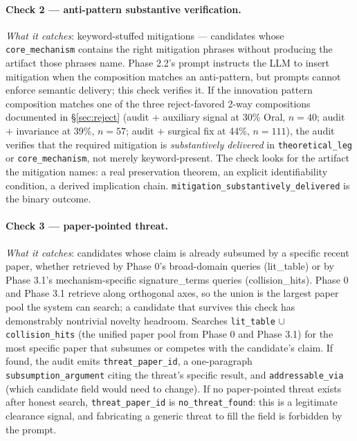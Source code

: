 \documentclass[10pt,a4paper]{article}
\begin{document}
\paragraph{Check 2 --- anti-pattern substantive verification.} \emph{What it catches}: keyword-stuffed mitigations --- candidates whose \texttt{core\_mechanism} contains the right mitigation phrases without producing the artifact those phrases name. Phase 2.2's prompt instructs the LLM to insert mitigation when the composition matches an anti-pattern, but prompts cannot enforce semantic delivery; this check verifies it. If the innovation pattern composition matches one of the three reject-favored 2-way compositions documented in \S\ref{sec:reject} (audit $+$ auxiliary signal at 30\% Oral, $n{=}40$; audit $+$ invariance at 39\%, $n{=}57$; audit $+$ surgical fix at 44\%, $n{=}111$), the audit verifies that the required mitigation is \emph{substantively delivered} in \texttt{theoretical\_leg} or \texttt{core\_mechanism}, not merely keyword-present. The check looks for the artifact the mitigation names: a real preservation theorem, an explicit identifiability condition, a derived implication chain. \texttt{mitigation\_substantively\_delivered} is the binary outcome.

\paragraph{Check 3 --- paper-pointed threat.} \emph{What it catches}: candidates whose claim is already subsumed by a specific recent paper, whether retrieved by Phase 0's broad-domain queries (lit\_table) or by Phase 3.1's mechanism-specific signature\_terms queries (collision\_hits). Phase 0 and Phase 3.1 retrieve along orthogonal axes, so the union is the largest paper pool the system can search; a candidate that survives this check has demonstrably nontrivial novelty headroom. Searches \texttt{lit\_table} $\cup$ \texttt{collision\_hits} (the unified paper pool from Phase 0 and Phase 3.1) for the most specific paper that subsumes or competes with the candidate's claim. If found, the audit emits \texttt{threat\_paper\_id}, a one-paragraph \texttt{subsumption\_argument} citing the threat's specific result, and \texttt{addressable\_via} (which candidate field would need to change). If no paper-pointed threat exists after honest search, \texttt{threat\_paper\_id} is \texttt{no\_threat\_found}: this is a legitimate clearance signal, and fabricating a generic threat to fill the field is forbidden by the prompt.
\end{document}
